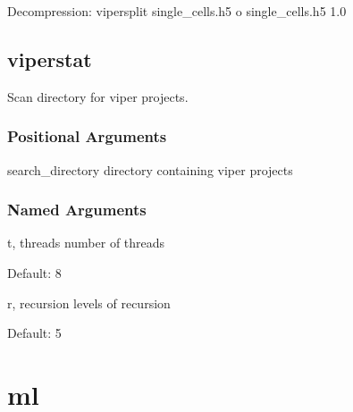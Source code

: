 \documentclass[letterpaper,10pt,english]{sphinxmanual}
\begin{document}
\sphinxAtStartPar
Decompression:
viper\sphinxhyphen{}split single\_cells.h5 \sphinxhyphen{}o single\_cells.h5 1.0


\section{viper\sphinxhyphen{}stat}
\label{\detokenize{pages/vipercmd:viper-stat}}
\sphinxAtStartPar

\sphinxAtStartPar
Scan directory for viper projects.


\begin{sphinxVerbatim}[commandchars=\\\{\}]
  \PYG{p}{[}\PYG{p}{]} \PYG{p}{[} \PYG{p}{]} \PYG{p}{[} \PYG{p}{]} \PYG{p}{[}\PYG{p}{]}
\end{sphinxVerbatim}


\subsection{Positional Arguments}
\label{\detokenize{pages/vipercmd:Positional Arguments}}\begin{optionlist}{3cm}
\item [search\_directory]  
\sphinxAtStartPar
directory containing viper projects
\end{optionlist}


\subsection{Named Arguments}
\label{\detokenize{pages/vipercmd:Named Arguments}}\begin{optionlist}{3cm}
\item [\sphinxhyphen{}t, \sphinxhyphen{}\sphinxhyphen{}threads]  
\sphinxAtStartPar
number of threads

\sphinxAtStartPar
Default: 8
\item [\sphinxhyphen{}r, \sphinxhyphen{}\sphinxhyphen{}recursion]  
\sphinxAtStartPar
levels of recursion

\sphinxAtStartPar
Default: 5
\end{optionlist}


\chapter{ml}
\label{\detokenize{pages/ml:ml}}\label{\detokenize{pages/ml::doc}}
\end{document}
